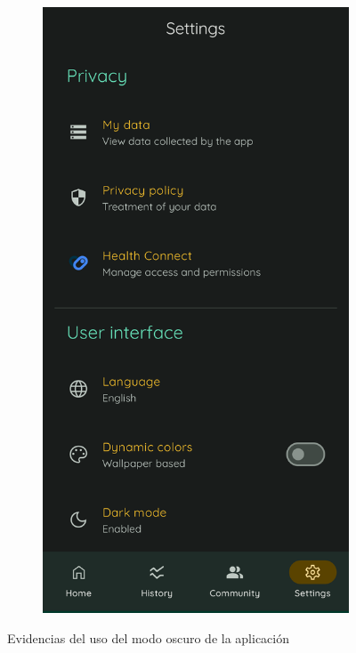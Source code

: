 \begin{figure}[htbp]
\begin{subfigure}[c]{0.4\textwidth}
                \end{subfigure}
                \hspace{0.1\textwidth}
                \begin{subfigure}[c]{0.4\textwidth}
                    \centering
                    \includegraphics[width=1\linewidth]{figures/pruebas/modo_oscuro/Despues.png}
                \end{subfigure}
                \caption{Evidencias del uso del modo oscuro de la aplicación}
                \label{figure:pruebas:modo_oscuro}
            \end{figure}
            
